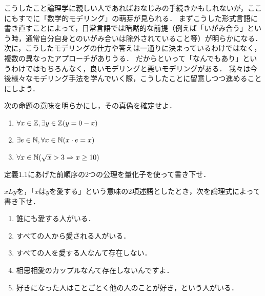 \documentclass[11pt,a4paper]{jsarticle}
\begin{document}
こうしたこと論理学に親しい人であればおなじみの手続きかもしれないが，ここにもすでに「数学的モデリング」の萌芽が見られる．
まずこうした形式言語に書き直すことによって，日常言語では暗黙的な前提（例えば「いがみ合う」という時，通常自分自身とのいがみ合いは除外されていること等）が明らかになる．
次に，こうしたモデリングの仕方や答えは一通りに決まっているわけではなく，複数の異なったアプローチがありうる．
だからといって「なんでもあり」というわけではもちろんなく，良いモデリングと悪いモデリングがある．
我々は今後様々なモデリング手法を学んでいく際，こうしたことに留意しつつ進めることにしよう．


\begin{exercise}
 次の命題の意味を明らかにし，その真偽を確定せよ．
\begin{enumerate}
 \item $\forall x \in \mathbb{Z}, \exists y \in \mathbb{Z} (y = 0 - x)$
 \item $\exists e \in \mathbb{N}, \forall x \in \mathbb{N} (x \cdot e = x)$
 \item $\forall x \in \mathbb{N} (\sqrt{x} > 3 \Rightarrow x \geq 10)$
\end{enumerate}
\end{exercise}

\begin{exercise}
 定義1.1にあげた前順序の2つの公理を量化子を使って書き下せ．
\end{exercise}





\begin{exercise}
 $xLy$を，「$x$は$y$を愛する」という意味の2項述語としたとき，次を論理式によって書き下せ．
\begin{enumerate}
 \item 誰にも愛する人がいる．
 \item すべての人から愛される人がいる．
 \item すべての人を愛する人なんて存在しない．
 \item 相思相愛のカップルなんて存在しないんですよ．
 \item 好きになった人はことごとく他の人のことが好き，という人がいる．
\end{enumerate}

\end{exercise}
\end{document}
